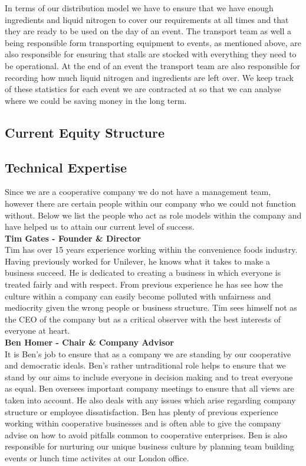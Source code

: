\documentclass{article}
\begin{document}
\begin{itemize}
  In terms of our distribution model we have to ensure that we have enough ingredients and liquid nitrogen to cover our requirements at all times and that they are ready to be used on the day of an event. The transport team as well a being responsible form transporting equipment to events, as mentioned above, are also responsible for ensuring that stalls are stocked with everything they need to be operational. At the end of an event the transport team are also responsible for recording how much liquid nitrogen and ingredients are left over. We keep track of these statistics for each event we are contracted at so that we can analyse where we could be saving money in the long term.
  \end{itemize}

  \subsection{Current Equity Structure}

  \subsection{Technical Expertise}

  Since we are a cooperative company we do not have a management team, however there are certain people within our company who we could not function without. Below we list the people who act as role models within the company and have helped us to attain our current level of success. \\

  {\bf Tim Gates - Founder \& Director} \\
  Tim has over 15 years experience working within the convenience foods industry. Having previously worked for Unilever, he knows what it takes to make a business succeed. He is dedicated to creating a business in which everyone is treated fairly and with respect. From previous experience he has see how the culture within a company can easily become polluted with unfairness and mediocrity given the wrong people or business structure. Tim sees himself not as the CEO of the company but as a critical observer with the best interests of everyone at heart. \\

  {\bf Ben Homer - Chair \& Company Advisor} \\
  It is Ben's job to ensure that as a company we are standing by our cooperative and democratic ideals. Ben's rather untraditional role helps to ensure that we stand by our aims to include everyone in decision making and to treat everyone as equal. Ben oversees important company meetings to ensure that all views are taken into account. He also deals with any issues which arise regarding company structure or employee dissatisfaction. Ben has plenty of previous experience working within cooperative businesses and is often able to give the company advise on how to avoid pitfalls common to cooperative enterprises. Ben is also responsible for nurturing our unique business culture by planning team building events or lunch time activites at our London office. \\
  
\end{document}
